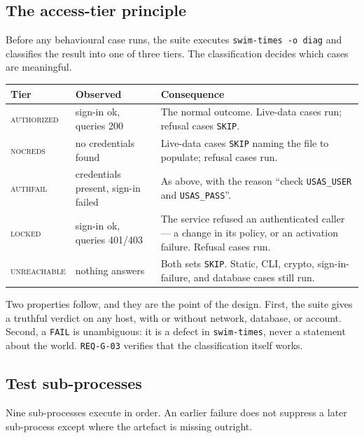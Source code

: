 \documentclass[12pt]{article}
\newcommand{\code}[1]{\texttt{#1}}
\newcommand{\req}[1]{\texttt{#1}}
\begin{document}
\subsection{The access-tier principle}\label{sec:tiers}

Before any behavioural case runs, the suite executes
\code{swim-times -o diag} and classifies the result into one of three
tiers.  The classification decides which cases are meaningful.

\begin{center}
\begin{tabular}{llp{5.6cm}}
  \toprule
  \textbf{Tier} & \textbf{Observed} & \textbf{Consequence} \\
  \midrule
  \textsc{authorized} & sign-in ok, queries 200
    & The normal outcome.  Live-data cases run; refusal cases
      \code{SKIP}. \\
  \textsc{nocreds} & no credentials found
    & Live-data cases \code{SKIP} naming the file to populate; refusal
      cases run. \\
  \textsc{authfail} & credentials present, sign-in failed
    & As above, with the reason ``check \code{USAS\_USER} and
      \code{USAS\_PASS}''. \\
  \textsc{locked} & sign-in ok, queries 401/403
    & The service refused an authenticated caller --- a change in its
      policy, or an activation failure.  Refusal cases run. \\
  \textsc{unreachable} & nothing answers
    & Both sets \code{SKIP}.  Static, CLI, crypto, sign-in-failure, and
      database cases still run. \\
  \bottomrule
\end{tabular}
\end{center}

\noindent Two properties follow, and they are the point of the design.
First, the suite gives a truthful verdict on any host, with or without
network, database, or account.  Second, a \code{FAIL} is unambiguous:
it is a defect in \code{swim-times}, never a statement about the
world.  \req{REQ-G-03} verifies that the classification itself works.

\subsection{Test sub-processes}

Nine sub-processes execute in order.  An earlier failure does not
suppress a later sub-process except where the artefact is missing
outright.
\end{document}
